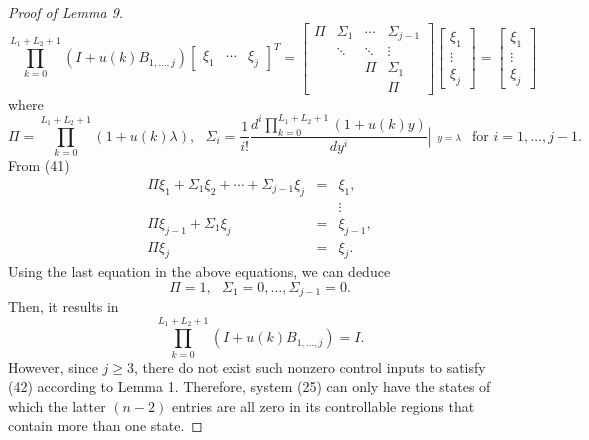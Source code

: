 \documentclass[journal,a4paper,12pt,onecolumn]{IEEEtran}
\begin{document}
\begin{proof}[Proof of Lemma 9]
\begin{equation}
\prod\limits_{k=0}^{L_{1}+L_{2}+1}\left( I+u\left( k\right) B_{1,\ldots
,j}\right) \left[
\begin{array}{ccc}
\xi _{1} & \cdots & \xi _{j}\end{array}\right] ^{T}=\left[
\begin{array}{cccc}
\Pi & \Sigma _{1} & \cdots & \Sigma _{j-1} \\
& \ddots & \ddots & \vdots \\
&  & \Pi & \Sigma _{1} \\
&  &  & \Pi \end{array}\right] \left[
\begin{array}{c}
\xi _{1} \\
\vdots \\
\xi _{j}\end{array}\right] =\left[
\begin{array}{c}
\xi _{1} \\
\vdots \\
\xi _{j}\end{array}\right]
\end{equation}where\begin{equation*}
\Pi =\prod\limits_{k=0}^{L_{1}+L_{2}+1}\left( 1+u\left( k\right) \lambda
\right) ,\text{ }\Sigma _{i}=\frac{1}{i!}\frac{d^{i}\prod \limits_{k=0}^{L_{1}+L_{2}+1}\left( 1+u\left( k\right) y\right) }{dy^{i}}\left\vert
\begin{array}{c}
\\
_{y=\lambda }\end{array}\right. \text{ for }i=1,\ldots ,j-1.
\end{equation*}From (41)\begin{eqnarray*}
\Pi \xi _{1}+\Sigma _{1}\xi _{2}+\cdots +\Sigma _{j-1}\xi _{j} &=&\xi _{1},
\\
&&\vdots \\
\Pi \xi _{j-1}+\Sigma _{1}\xi _{j} &=&\xi _{j-1}, \\
\Pi \xi _{j} &=&\xi _{j}.
\end{eqnarray*}Using the last equation in the above equations, we can deduce\begin{equation*}
\Pi =1,\text{ }\Sigma _{1}=0,\ldots ,\Sigma _{j-1}=0.
\end{equation*}Then, it results in\begin{equation}
\prod\limits_{k=0}^{L_{1}+L_{2}+1}\left( I+u\left( k\right) B_{1,\ldots
,j}\right) =I.
\end{equation}However, since $j\geq 3$, there do not exist such nonzero control inputs to
satisfy (42) according to Lemma 1. Therefore, system (25) can only have the
states of which the latter $\left( n-2\right) $ entries are all zero in its
controllable regions that contain more than one state.
\end{proof}
\end{document}
